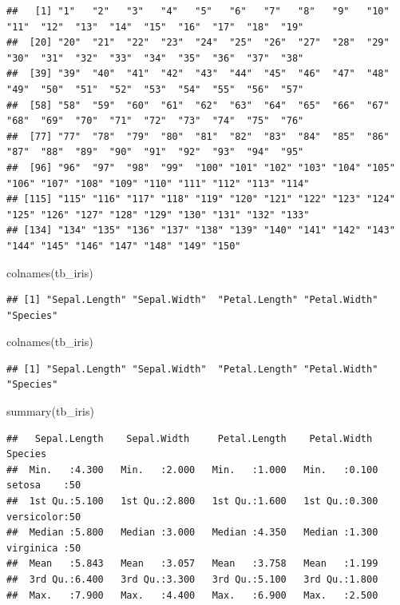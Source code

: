 \documentclass[
]{book}
\newenvironment{Shaded}{\begin{snugshade}}{\end{snugshade}}
\newcommand{\FunctionTok}[1]{\textcolor[rgb]{0.00,0.00,0.00}{#1}}
\newcommand{\NormalTok}[1]{#1}
\begin{document}
\begin{verbatim}
##   [1] "1"   "2"   "3"   "4"   "5"   "6"   "7"   "8"   "9"   "10"  "11"  "12"  "13"  "14"  "15"  "16"  "17"  "18"  "19" 
##  [20] "20"  "21"  "22"  "23"  "24"  "25"  "26"  "27"  "28"  "29"  "30"  "31"  "32"  "33"  "34"  "35"  "36"  "37"  "38" 
##  [39] "39"  "40"  "41"  "42"  "43"  "44"  "45"  "46"  "47"  "48"  "49"  "50"  "51"  "52"  "53"  "54"  "55"  "56"  "57" 
##  [58] "58"  "59"  "60"  "61"  "62"  "63"  "64"  "65"  "66"  "67"  "68"  "69"  "70"  "71"  "72"  "73"  "74"  "75"  "76" 
##  [77] "77"  "78"  "79"  "80"  "81"  "82"  "83"  "84"  "85"  "86"  "87"  "88"  "89"  "90"  "91"  "92"  "93"  "94"  "95" 
##  [96] "96"  "97"  "98"  "99"  "100" "101" "102" "103" "104" "105" "106" "107" "108" "109" "110" "111" "112" "113" "114"
## [115] "115" "116" "117" "118" "119" "120" "121" "122" "123" "124" "125" "126" "127" "128" "129" "130" "131" "132" "133"
## [134] "134" "135" "136" "137" "138" "139" "140" "141" "142" "143" "144" "145" "146" "147" "148" "149" "150"
\end{verbatim}

\begin{Shaded}
\begin{Highlighting}[]
\FunctionTok{colnames}\NormalTok{(tb\_iris)}
\end{Highlighting}
\end{Shaded}

\begin{verbatim}
## [1] "Sepal.Length" "Sepal.Width"  "Petal.Length" "Petal.Width"  "Species"
\end{verbatim}

\begin{Shaded}
\begin{Highlighting}[]
\FunctionTok{colnames}\NormalTok{(tb\_iris)}
\end{Highlighting}
\end{Shaded}

\begin{verbatim}
## [1] "Sepal.Length" "Sepal.Width"  "Petal.Length" "Petal.Width"  "Species"
\end{verbatim}

\begin{Shaded}
\begin{Highlighting}[]
\FunctionTok{summary}\NormalTok{(tb\_iris)}
\end{Highlighting}
\end{Shaded}

\begin{verbatim}
##   Sepal.Length    Sepal.Width     Petal.Length    Petal.Width          Species  
##  Min.   :4.300   Min.   :2.000   Min.   :1.000   Min.   :0.100   setosa    :50  
##  1st Qu.:5.100   1st Qu.:2.800   1st Qu.:1.600   1st Qu.:0.300   versicolor:50  
##  Median :5.800   Median :3.000   Median :4.350   Median :1.300   virginica :50  
##  Mean   :5.843   Mean   :3.057   Mean   :3.758   Mean   :1.199                  
##  3rd Qu.:6.400   3rd Qu.:3.300   3rd Qu.:5.100   3rd Qu.:1.800                  
##  Max.   :7.900   Max.   :4.400   Max.   :6.900   Max.   :2.500
\end{verbatim}
\end{document}
